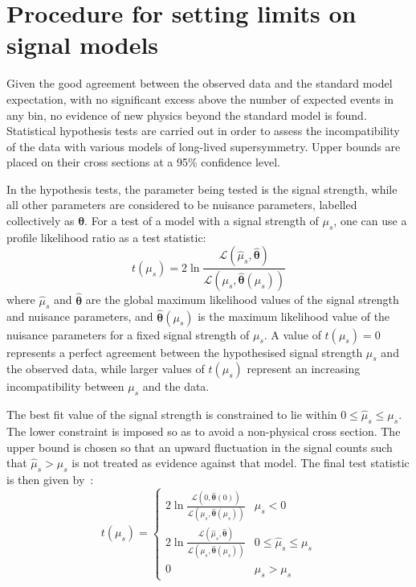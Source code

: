 \section{Procedure for setting limits on signal models}
\label{sec:results-limitsproc}
Given the good agreement between the observed data and the standard model 
expectation, with no significant excess above the number of expected events in 
any bin, no evidence of new physics beyond the standard model is found. 
Statistical hypothesis tests are carried out in order to assess the 
incompatibility of the data with various models of long-lived supersymmetry. 
Upper bounds are placed on their cross sections at a 95\% confidence level.

In the hypothesis tests, the parameter being tested is the signal strength, 
while all other parameters are considered to be nuisance parameters, labelled 
collectively as $\bm{\theta}$.
For a test of a model with a signal strength of $\mu_s$, one can use a profile 
likelihood ratio as a test statistic:
\begin{equation}
t(\mu_s) = 2 \ln \frac{\mathcal{L}(\hat{\mu}_s, 
\hat{\bm{\theta}})}{\mathcal{L}(\mu_s, \hat{\bm{\theta}}(\mu_s))}
\end{equation}
where $\hat{\mu}_s$ and $\hat{\bm{\theta}}$ are the global maximum likelihood 
values of the signal strength 
and nuisance parameters, and $\hat{\bm{\theta}}(\mu_s)$ is the maximum 
likelihood value of the nuisance 
parameters for a fixed signal strength of $\mu_s$. 
A value of $t(\mu_s)=0$ represents a perfect agreement between the hypothesised 
signal strength $\mu_s$ and the observed data, while larger values of 
$t(\mu_s)$ represent an increasing incompatibility between $\mu_s$ and the data.

The best fit value of the signal strength is constrained to lie within $0 \le 
\hat{\mu}_s \le \mu_s$. The lower constraint is imposed so as to avoid a  
non-physical cross section. The upper bound is chosen so that an upward 
fluctuation in the signal counts such that $\hat{\mu}_s > \mu_s$ is not treated 
as evidence against that model. 
The final test statistic is then given by~\cite{higgscombine}:
\begin{equation}
t(\mu_s) = 
	\begin{cases}
	2 \ln \frac{\mathcal{L}(0, \hat{\bm{\theta}}(0))}{\mathcal{L}(\mu_s, 
	\hat{\bm{\theta}}(\mu_s))} & \hat{\mu}_s < 0 \\
	2 \ln \frac{\mathcal{L}(\hat{\mu}_s, \hat{\bm{\theta}})}{\mathcal{L}(\mu_s, 
	\hat{\bm{\theta}}(\mu_s))} & 0 \le \hat{\mu}_s \le \mu_s \\
	0 & \hat{\mu}_s > \mu_s
	\end{cases}
\end{equation}

